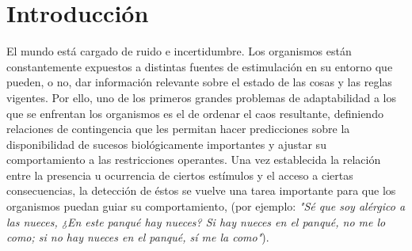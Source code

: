 
\chapter{Introducción} %

\label{Chapter1} %


\newcommand{\keyword}[1]{\textbf{#1}}
\newcommand{\tabhead}[1]{\textbf{#1}}
\newcommand{\code}[1]{\texttt{#1}}
\newcommand{\file}[1]{\texttt{\bfseries#1}}
\newcommand{\option}[1]{\texttt{\itshape#1}}


El mundo está cargado de ruido e incertidumbre. Los organismos están constantemente expuestos a distintas fuentes de estimulación en su entorno que pueden, o no, dar información relevante sobre el estado de las cosas y las reglas vigentes. Por ello, uno de los primeros grandes problemas de adaptabilidad a los que se enfrentan los organismos es el de ordenar el caos resultante, definiendo relaciones de contingencia que les permitan hacer predicciones sobre la disponibilidad de sucesos biológicamente importantes y ajustar su comportamiento a las restricciones operantes. Una vez establecida la relación entre la presencia u ocurrencia de ciertos estímulos y el acceso a ciertas consecuencias, la detección de éstos se vuelve una tarea importante para que los organismos puedan guiar su comportamiento, (por ejemplo: \textit{"Sé que soy alérgico a las nueces, ¿En este panqué hay nueces? Si hay nueces en el panqué, no me lo como; si no hay nueces en el panqué, sí me la como"}).\\


